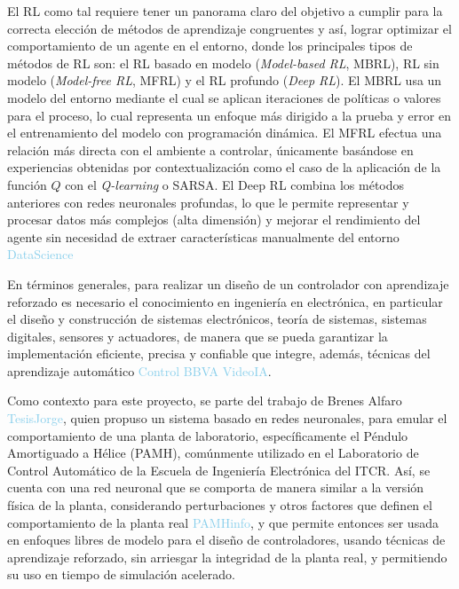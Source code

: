 El RL como tal requiere tener un panorama claro del objetivo a cumplir para la correcta elección de métodos de aprendizaje congruentes y así, lograr optimizar el comportamiento de un agente en el entorno, donde los principales tipos de métodos de RL son: el RL basado en modelo (\textit{Model-based RL}, MBRL), RL sin modelo (\textit{Model-free RL}, MFRL) y el RL profundo (\textit{Deep RL}). El MBRL usa un modelo del entorno mediante el cual se aplican iteraciones de políticas o valores para el proceso, lo cual representa un enfoque más dirigido a la prueba y error en el entrenamiento del modelo con programación dinámica.  El MFRL efectua una relación más directa con el ambiente a controlar, únicamente basándose en experiencias obtenidas por contextualización como el caso de la aplicación de la función $Q$ con el \textit{Q-learning} o SARSA. El Deep RL combina los métodos anteriores con redes neuronales profundas, lo que le permite representar y procesar datos más complejos (alta dimensión) y mejorar el rendimiento del agente sin necesidad de extraer características manualmente del entorno \textcolor{SkyBlue}{DataScience}

En términos generales, para realizar un diseño de un controlador con aprendizaje reforzado es necesario el conocimiento en ingeniería en electrónica, en particular el diseño y construcción de sistemas electrónicos, teoría de sistemas, sistemas digitales, sensores y actuadores, de manera que se pueda garantizar la implementación eficiente, precisa y confiable que integre, además, técnicas del aprendizaje automático \textcolor{SkyBlue}{Control} \textcolor{SkyBlue}{BBVA} \textcolor{SkyBlue}{VideoIA}.

Como contexto para este proyecto, se parte del trabajo de Brenes Alfaro \textcolor{SkyBlue}{TesisJorge}, quien propuso un sistema basado en redes neuronales, para emular el comportamiento de una planta de laboratorio, específicamente el Péndulo Amortiguado a Hélice (PAMH), comúnmente utilizado en el Laboratorio de Control Automático de la Escuela de Ingeniería Electrónica del ITCR. Así, se cuenta con una red neuronal que se comporta de manera similar a la versión física de la planta, considerando perturbaciones y otros factores que definen el comportamiento de la planta real \textcolor{SkyBlue}{PAMHinfo}, y que permite entonces ser usada en enfoques libres de modelo para el diseño de controladores, usando técnicas de aprendizaje reforzado, sin arriesgar la integridad de la planta real, y permitiendo su uso en tiempo de simulación acelerado.

